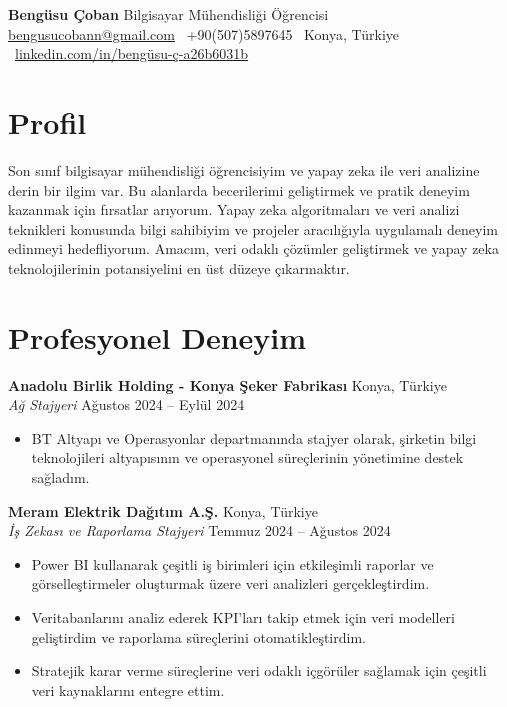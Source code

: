 \documentclass[10pt,a4paper]{extarticle}
\begin{document}
\begin{center}
    \begin{minipage}{\textwidth}
        \centering
        {\LARGE\textbf{Bengüsu Çoban}} \hspace{2pt} {\LARGE{Bilgisayar Mühendisliği Öğrencisi}}\\[10pt]
        \href{mailto:bengusucobann@gmail.com}{bengusucobann@gmail.com} \textbullet\
        +90(507)5897645 \textbullet\
        Konya, Türkiye \textbullet\
        \href{https://linkedin.com/in/bengüsu-ç-a26b6031b}{linkedin.com/in/bengüsu-ç-a26b6031b}
    \end{minipage}
\end{center}
\section{Profil}
Son sınıf bilgisayar mühendisliği öğrencisiyim ve yapay zeka ile veri analizine derin bir ilgim var. Bu alanlarda becerilerimi geliştirmek ve pratik deneyim kazanmak için fırsatlar arıyorum. Yapay zeka algoritmaları ve veri analizi teknikleri konusunda bilgi sahibiyim ve projeler aracılığıyla uygulamalı deneyim edinmeyi hedefliyorum. Amacım, veri odaklı çözümler geliştirmek ve yapay zeka teknolojilerinin potansiyelini en üst düzeye çıkarmaktır.

\section{Profesyonel Deneyim}
\textbf{Anadolu Birlik Holding - Konya Şeker Fabrikası} \hfill Konya, Türkiye\\
\textit{Ağ Stajyeri} \hfill Ağustos 2024 -- Eylül 2024
\begin{itemize}[leftmargin=*,noitemsep,topsep=0pt]
    \item BT Altyapı ve Operasyonlar departmanında stajyer olarak, şirketin bilgi teknolojileri altyapısının ve operasyonel süreçlerinin yönetimine destek sağladım.
\end{itemize}

\textbf{Meram Elektrik Dağıtım A.Ş.} \hfill Konya, Türkiye\\
\textit{İş Zekası ve Raporlama Stajyeri} \hfill Temmuz 2024 -- Ağustos 2024
\begin{itemize}[leftmargin=*,noitemsep,topsep=0pt]
    \item Power BI kullanarak çeşitli iş birimleri için etkileşimli raporlar ve görselleştirmeler oluşturmak üzere veri analizleri gerçekleştirdim.
    \item Veritabanlarını analiz ederek KPI'ları takip etmek için veri modelleri geliştirdim ve raporlama süreçlerini otomatikleştirdim.
    \item Stratejik karar verme süreçlerine veri odaklı içgörüler sağlamak için çeşitli veri kaynaklarını entegre ettim.
\end{itemize}
\end{document}
